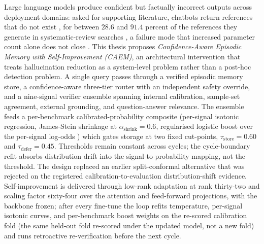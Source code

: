Large language models produce confident but factually incorrect outputs across deployment domains: asked for supporting literature, chatbots return references that do not exist \cite{alkaissi2023artificial}, for between $28.6$ and $91.4$ percent of the references they generate in systematic-review searches \cite{info:doi/10.2196/53164}, a failure mode that increased parameter count alone does not close \cite{lin-etal-2022-truthfulqa}. This thesis proposes \emph{Confidence-Aware Episodic Memory with Self-Improvement (CAEM)}, an architectural intervention that treats hallucination reduction as a system-level problem rather than a post-hoc detection problem. A single query passes through a verified episodic memory store, a confidence-aware three-tier router with an independent safety override, and a nine-signal verifier ensemble spanning internal calibration, sample-set agreement, external grounding, and question-answer relevance. The ensemble feeds a per-benchmark calibrated-probability composite (per-signal isotonic regression, James-Stein shrinkage at $\alpha_{\text{shrink}} = 0.6$, regularised logistic boost over the per-signal log-odds \cite{valentin2024hallucination}) which gates storage at two fixed cut-points, $\tau_{\text{store}} = 0.60$ and $\tau_{\text{defer}} = 0.45$. Thresholds remain constant across cycles; the cycle-boundary refit absorbs distribution drift into the signal-to-probability mapping, not the threshold. The design replaced an earlier split-conformal alternative \cite{mohri2024conformal} that was rejected on the registered calibration-to-evaluation distribution-shift evidence. Self-improvement is delivered through low-rank adaptation \cite{hu2022lora} at rank thirty-two and scaling factor sixty-four over the attention and feed-forward projections, with the backbone frozen; after every fine-tune the loop refits temperature, per-signal isotonic curves, and per-benchmark boost weights on the re-scored calibration fold (the same held-out fold re-scored under the updated model, not a new fold) and runs retroactive re-verification before the next cycle.

